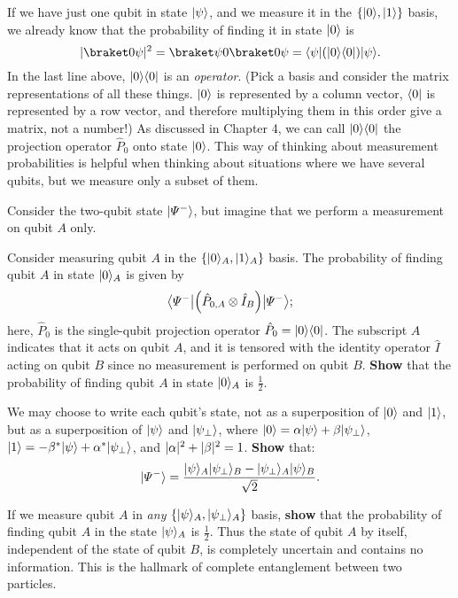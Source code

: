 \documentclass{../phys084}
\begin{document}
\begin{exercise}
  If we have just one qubit in state \(\ket \psi\), and we measure it
  in the \(\set{\ket 0, \ket 1}\) basis, we already know that the
  probability of finding it in state \(\ket 0\) is
  \[
    \abs{\braket 0 \psi}^2
    = \braket \psi 0\braket 0 \psi
    = \bra \psi (\ket 0 \bra 0) \ket \psi.
  \]
  In the last line above, \(\ket 0 \bra 0\) is an \textit{operator}.
  (Pick a basis and consider the matrix representations of all these
  things.  \(\ket 0\) is represented by a column vector, \(\bra 0\) is
  represented by a row vector, and therefore multiplying them in this
  order give a matrix, not a number!)  As discussed in Chapter 4, we
  can call \(\ket 0 \bra 0\) the projection operator \(\hat P_0\) onto
  state \(\ket 0\).  This way of thinking about measurement
  probabilities is helpful when thinking about situations where we
  have several qubits, but we measure only a subset of them.

  Consider the two-qubit state \(\ket{\Psi^-}\), but imagine that we
  perform a measurement on qubit \(A\) only.
\end{exercise}

\begin{problems}
\item Consider measuring qubit \(A\) in the
  \(\set{\ket 0_A, \ket 1_A}\) basis.  The probability of finding
  qubit \(A\) in state \(\ket 0_A\) is given by
  \[
    \bra*{\Psi^-} \prn*{\hat P_{0,A} \otimes \hat I_B} \ket*{\Psi^-};
  \]
  here, \(\hat P_ 0\) is the single-qubit projection operator
  \(\hat P_ 0 = \ket 0 \bra 0\).  The subscript \(A\) indicates that
  it acts on qubit \(A\), and it is tensored with the identity
  operator \(\hat I\) acting on qubit \(B\) since no measurement is
  performed on qubit \(B\).  \textbf{Show} that the probability of
  finding qubit \(A\) in state \(\ket 0_A\) is \(\frac 1 2\).

\item We may choose to write each qubit's state, not as a
  superposition of \(\ket 0\) and \(\ket 1\), but as a superposition
  of \(\ket \psi\) and \(\ket{\psi_\perp}\), where
  \(\ket 0 = \alpha \ket \psi + \beta \ket{\psi_\perp}\),
  \(\ket 1 = -\beta^* \ket \psi + \alpha^* \ket{\psi_\perp}\), and
  \(\abs \alpha^2 + \abs \beta^2 = 1\).  \textbf{Show} that:
  \[
    \ket{\Psi^-} = \frac
    {\ket \psi_A\ket{\psi_\perp}_B - \ket{\psi_\perp}_A\ket \psi_B}
    {\sqrt 2}.
  \]

\item If we measure qubit \(A\) in \textit{any}
  \(\set*{\ket \psi_A, \ket{\psi_\perp}_A}\) basis, \textbf{show} that
  the probability of finding qubit \(A\) in the state \(\ket \psi_A\)
  is \(\frac 1 2\).  Thus the state of qubit \(A\) by itself,
  independent of the state of qubit \(B\), is completely uncertain and
  contains no information.  This is the hallmark of complete
  entanglement between two particles.

\end{problems}
\end{document}
